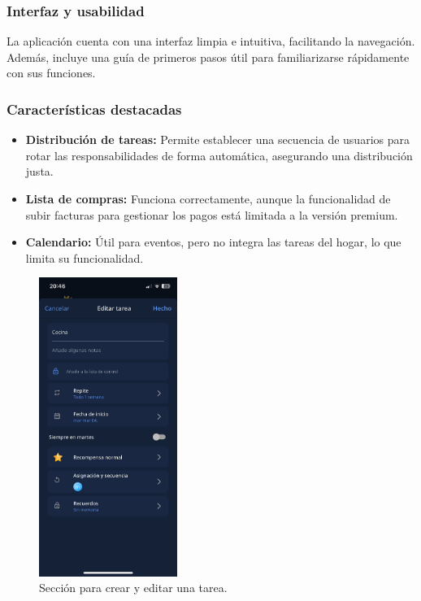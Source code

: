 \subsubsection*{Interfaz y usabilidad}
La aplicación cuenta con una interfaz limpia e intuitiva, facilitando la navegación. Además, incluye una guía de primeros pasos útil para familiarizarse rápidamente con sus funciones.

\subsubsection*{Características destacadas}
\begin{itemize}
    \item \textbf{Distribución de tareas:} Permite establecer una secuencia de usuarios para rotar las responsabilidades de forma automática, asegurando una distribución justa.
    \item \textbf{Lista de compras:} Funciona correctamente, aunque la funcionalidad de subir facturas para gestionar los pagos está limitada a la versión premium.
    \item \textbf{Calendario:} Útil para eventos, pero no integra las tareas del hogar, lo que limita su funcionalidad.
\end{itemize}
\begin{figure}[H]
    \centering
    \includegraphics[width=0.4\textwidth]{fotos/creacion-tarea-flatify.jpeg}
    \caption{Sección para crear y editar una tarea\textbf{}.}
\end{figure}

